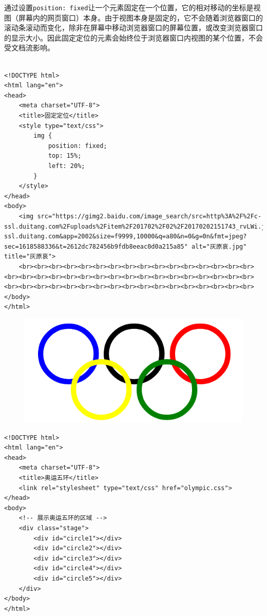 通过设置\lstinline|position: fixed|让一个元素固定在一个位置，它的相对移动的坐标是视图（屏幕内的网页窗口）本身。由于视图本身是固定的，它不会随着浏览器窗口的滚动条滚动而变化，除非在屏幕中移动浏览器窗口的屏幕位置，或改变浏览器窗口的显示大小。因此固定定位的元素会始终位于浏览器窗口内视图的某个位置，不会受文档流影响。 \\

 \\
\begin{lstlisting}[style=htmlcssjs, breaklines=true, breakatwhitespace=false]
<!DOCTYPE html>
<html lang="en">
<head>
    <meta charset="UTF-8">
    <title>固定定位</title>
    <style type="text/css">
        img {
            position: fixed;
            top: 15%;
            left: 20%;
        }
    </style>
</head>
<body>
    <img src="https://gimg2.baidu.com/image_search/src=http%3A%2F%2Fc-ssl.duitang.com%2Fuploads%2Fitem%2F201702%2F02%2F20170202151743_rvLWi.jpeg&refer=http%3A%2F%2Fc-ssl.duitang.com&app=2002&size=f9999,10000&q=a80&n=0&g=0n&fmt=jpeg?sec=1618588336&t=2612dc782456b9fdb8eeac0d0a215a85" alt="灰原哀.jpg" title="灰原哀">
    <br><br><br><br><br><br><br><br><br><br><br><br><br><br><br><br><br><br><br><br><br><br><br><br><br><br><br><br><br><br><br><br><br><br><br><br><br><br><br><br><br><br><br><br><br><br><br><br><br><br>
</body>
</html>
\end{lstlisting}


\begin{figure}[H]
    \centering
    \includegraphics[scale=0.7]{img/C8/8-4/1.png}
\end{figure}

\begin{lstlisting}[style=htmlcssjs, title=olympic.html]
<!DOCTYPE html>
<html lang="en">
<head>
    <meta charset="UTF-8">
    <title>奥运五环</title>
    <link rel="stylesheet" type="text/css" href="olympic.css">
</head>
<body>
    <!-- 展示奥运五环的区域 -->
    <div class="stage">
        <div id="circle1"></div>
        <div id="circle2"></div>
        <div id="circle3"></div>
        <div id="circle4"></div>
        <div id="circle5"></div>
    </div>
</body>
</html>
\end{lstlisting}

